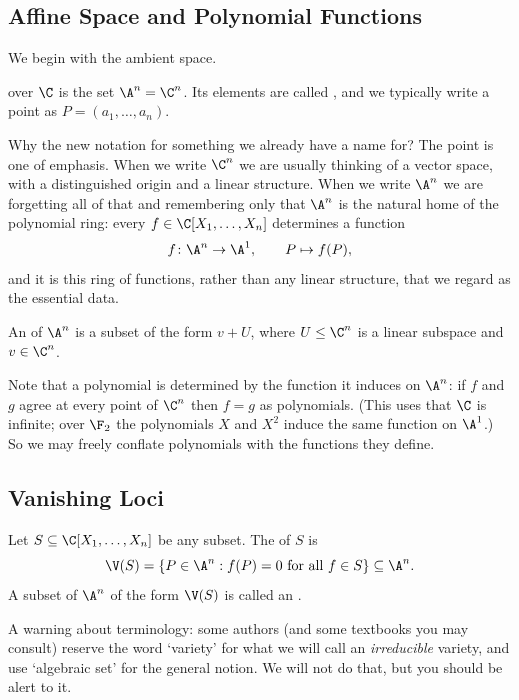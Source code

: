 \subsection{Affine Space and Polynomial Functions}

We begin with the ambient space.

\begin{definition}
	 over $\C$ is the set $\A^n = \C^n$. Its elements are called , and we typically write a point as $P = (a_1,\dots,a_n)$.
\end{definition}

Why the new notation for something we already have a name for? The point is one of emphasis. When we write $\C^n$ we are usually thinking of a vector space, with a distinguished origin and a linear structure. When we write $\A^n$ we are forgetting all of that and remembering only that $\A^n$ is the natural home of the polynomial ring: every $f \in \C[X_1,\dots,X_n]$ determines a function
$$f \colon \A^n \to \A^1, \qquad P \mapsto f(P),$$
and it is this ring of functions, rather than any linear structure, that we regard as the essential data.

\begin{definition}
	An  of $\A^n$ is a subset of the form $v + U$, where $U \leq \C^n$ is a linear subspace and $v \in \C^n$.
\end{definition}

Note that a polynomial is determined by the function it induces on $\A^n$: if $f$ and $g$ agree at every point of $\C^n$ then $f = g$ as polynomials. (This uses that $\C$ is infinite; over $\F_2$ the polynomials $X$ and $X^2$ induce the same function on $\A^1$.) So we may freely conflate polynomials with the functions they define.

\subsection{Vanishing Loci}

\begin{definition}
	Let $S \subseteq \C[X_1,\dots,X_n]$ be any subset. The  of $S$ is
	$$\V(S) = \{P \in \A^n : f(P) = 0 \text{ for all } f \in S\} \subseteq \A^n.$$
	A subset of $\A^n$ of the form $\V(S)$ is called an .
\end{definition}

A warning about terminology: some authors (and some textbooks you may consult) reserve the word `variety' for what we will call an \emph{irreducible} variety, and use `algebraic set' for the general notion. We will not do that, but you should be alert to it.

